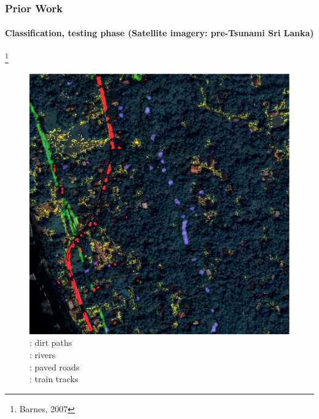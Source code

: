 \begin{frame}
\frametitle{Prior Work}
\framesubtitle{\small Classification, testing phase (Satellite imagery: pre-Tsunami Sri Lanka)}
\mypagenum\footnote{Barnes, 2007}
	\begin{figure}		
		\includegraphics[height=0.4\textheight]{figs/RVQ_SatelliteSriLanka_3_labeling.png}
		\caption{: dirt paths \\: rivers \\: paved roads \\: train tracks}
	\end{figure}
\end{frame}



